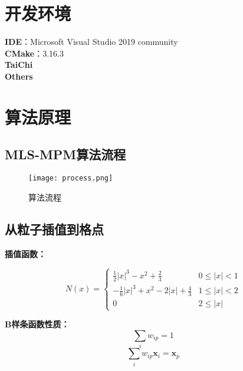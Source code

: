 \documentclass[14pt]{scrartcl} %
\begin{document}
\section{开发环境}

\textbf{IDE}：Microsoft Visual Studio 2019 community\\
\textbf{CMake}：3.16.3\\
\textbf{TaiChi} \\
\textbf{Others}

\section{算法原理}

\subsection{MLS-MPM算法流程\cite{hu2018mlsmpmcpic}}
\begin{figure}[h] %
	\centering
	\texttt{[image: process.png]} %
	\caption{算法流程}
\end{figure}
\pagebreak
\subsection{从粒子插值到格点}
\textbf{插值函数：}

\begin{equation}
N(x)=\begin{cases}
\frac{1}{2}|x|^3-x^2+\frac{2}{3}&0\leq |x|<1\\
-\frac{1}{6}|x|^3+x^2-2|x|+\frac{4}{3}&1\leq |x|<2\\
0&2\leq |x|

\end{cases}
\end{equation}

\textbf{B样条函数性质：}
\begin{equation}
\sum\limits_i w_{ip}=1
\end{equation}
\begin{equation}
\sum\limits_i w_{ip}\boldsymbol x_i=\boldsymbol x_p
\end{equation}
\end{document}
